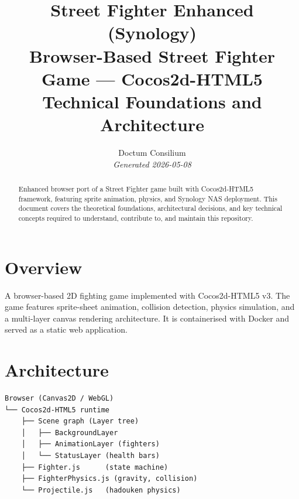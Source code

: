 \documentclass[11pt,a4paper]{article}
\begin{document}
\title{
  \textcolor{doctum}{\Large\textbf{Street Fighter Enhanced (Synology)}} \\[0.5em]
  \large Browser-Based Street Fighter Game — Cocos2d-HTML5 \\[0.3em]
  \normalsize Technical Foundations and Architecture
}
\author{Doctum Consilium \\ \small\textit{Generated 2026-05-08}}
\date{}
\maketitle
\thispagestyle{fancy}

\begin{abstract}
Enhanced browser port of a Street Fighter game built with Cocos2d-HTML5 framework, featuring sprite animation, physics, and Synology NAS deployment.
This document covers the theoretical foundations, architectural decisions,
and key technical concepts required to understand, contribute to, and
maintain this repository.
\end{abstract}

\tableofcontents
\newpage

\section{Overview}

A browser-based 2D fighting game implemented with Cocos2d-HTML5 v3.
The game features sprite-sheet animation, collision detection, physics
simulation, and a multi-layer canvas rendering architecture.
It is containerised with Docker and served as a static web application.


\section{Architecture}

\begin{verbatim}
Browser (Canvas2D / WebGL)
└── Cocos2d-HTML5 runtime
    ├── Scene graph (Layer tree)
    │   ├── BackgroundLayer
    │   ├── AnimationLayer (fighters)
    │   └── StatusLayer (health bars)
    ├── Fighter.js      (state machine)
    ├── FighterPhysics.js (gravity, collision)
    └── Projectile.js   (hadouken physics)
\end{verbatim}
\end{document}
